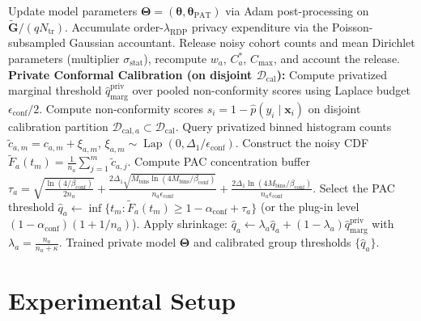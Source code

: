\documentclass[3p,12pt]{elsarticle}
\theoremstyle{plain}
\theoremstyle{definition}
\begin{document}
\begin{algorithm}[t]
\begin{algorithmic}[1]
        \STATE Update model parameters $\boldsymbol{\Theta} = (\boldsymbol{\theta}, \boldsymbol{\theta}_{\text{PAT}})$ via Adam post-processing on $\tilde{\mathbf{G}} / (q N_{\text{tr}})$.
        \STATE Accumulate order-$\lambda_{\text{RDP}}$ privacy expenditure via the Poisson-subsampled Gaussian accountant.
    \ENDFOR
        \STATE Release noisy cohort counts and mean Dirichlet parameters (multiplier $\sigma_{\text{stat}}$), recompute $w_a$, $C_a^*$, $C_{\max}$, and account the release.
    \ENDIF
\ENDFOR
\STATE \textbf{Private Conformal Calibration (on disjoint $\mathcal{D}_{\text{cal}}$):}
\STATE Compute privatized marginal threshold $\hat{q}_{\text{marg}}^{\text{priv}}$ over pooled non-conformity scores using Laplace budget $\epsilon_{\text{conf}}/2$.
    \STATE Compute non-conformity scores $s_i = 1 - \hat{p}(y_i \mid \mathbf{x}_i)$ on disjoint calibration partition $\mathcal{D}_{\text{cal}, a} \subset \mathcal{D}_{\text{cal}}$.
    \STATE Query privatized binned histogram counts $\tilde{c}_{a, m} = c_{a, m} + \xi_{a, m}$, $\xi_{a, m} \sim \operatorname{Lap}(0, \Delta_1/\epsilon_{\text{conf}})$.
    \STATE Construct the noisy CDF $\widetilde{F}_a(t_m) = \frac{1}{n_a}\sum_{j=1}^m \tilde{c}_{a, j}$.
    \STATE Compute PAC concentration buffer $\tau_a = \sqrt{\frac{\ln(4/\beta_{\text{conf}})}{2 n_a}} + \frac{2 \Delta_1 \sqrt{M_{\text{bins}} \ln(4M_{\text{bins}}/\beta_{\text{conf}})}}{n_a \epsilon_{\text{conf}}} + \frac{2 \Delta_1 \ln(4M_{\text{bins}}/\beta_{\text{conf}})}{n_a \epsilon_{\text{conf}}}$.
    \STATE Select the PAC threshold $\hat{q}_a \leftarrow \inf \{t_m : \widetilde{F}_a(t_m) \ge 1 - \alpha_{\text{conf}} + \tau_a\}$ (or the plug-in level $(1-\alpha_{\text{conf}})(1+1/n_a)$).
    \STATE Apply shrinkage: $\hat{q}_a \leftarrow \lambda_a \hat{q}_a + (1 - \lambda_a) \hat{q}_{\text{marg}}^{\text{priv}}$ with $\lambda_a = \frac{n_a}{n_a + \kappa}$.
\ENDFOR
\RETURN Trained private model $\boldsymbol{\Theta}$ and calibrated group thresholds $\{\hat{q}_a\}$.
\end{algorithmic}
\end{algorithm}

\section{Experimental Setup}
\label{sec:experiments}
\end{document}
